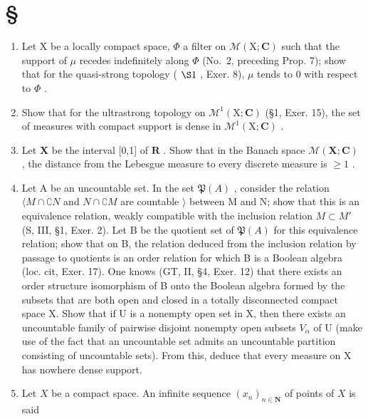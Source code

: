 \section*{\texorpdfstring{\S\CurrentExerciseGroup}{Section \CurrentExerciseGroup}}
{}

\begin{enumerate}
\def\labelenumi{\arabic{enumi})}
\item
  Let X be a locally compact space, \(\Phi\) a filter on \(\mathcal{M}(\mathrm{X};\mathbf{C})\) such that the support of \(\mu\) recedes indefinitely along \(\Phi\) (No.~2, preceding Prop. 7); show that for the quasi-strong topology ( \(\S1\) , Exer. 8), \(\mu\) tends to 0 with respect to \(\Phi\) .
\item
  Show that for the ultrastrong topology on \(\mathcal{M}^1 (\mathrm{X};\mathbf{C})\) (§1, Exer. 15), the set of measures with compact support is dense in \(\mathcal{M}^1 (\mathrm{X};\mathbf{C})\) .
\item
  Let \(\mathbf{X}\) be the interval {[}0,1{]} of \(\mathbf{R}\) . Show that in the Banach space \(\mathcal{M}(\mathbf{X};\mathbf{C})\) , the distance from the Lebesgue measure to every discrete measure is \(\geqslant 1\) .
\item
  Let A be an uncountable set. In the set \(\mathfrak{P}(A)\) , consider the relation \(\langle M \cap \complement N\) and \(N \cap \complement M\) are countable \(\rangle\) between M and N; show that this is an equivalence relation, weakly compatible with the inclusion relation \(M \subset M'\) (S, III, §1, Exer. 2). Let B be the quotient set of \(\mathfrak{P}(A)\) for this equivalence relation; show that on B, the relation deduced from the inclusion relation by passage to quotients is an order relation for which B is a Boolean algebra (loc. cit, Exer. 17). One knows (GT, II, §4, Exer. 12) that there exists an order structure isomorphism of B onto the Boolean algebra formed by the subsets that are both open and closed in a totally disconnected compact space X. Show that if U is a nonempty open set in X, then there exists an uncountable family of pairwise disjoint nonempty open subsets \(V_{\alpha}\) of U (make use of the fact that an uncountable set admits an uncountable partition consisting of uncountable sets). From this, deduce that every measure on X has nowhere dense support.
\item
  Let \(X\) be a compact space. An infinite sequence \((x_{n})_{n\in \mathbf{N}}\) of points of \(X\) is said
\end{enumerate}

